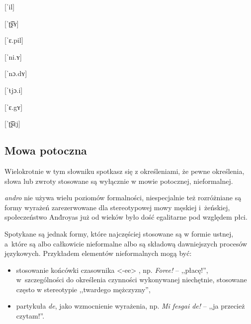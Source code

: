 \begin{spacing}{1.1}
\begin{multicols}{2}

        [ˈil]

        [ˈʈ͡ʂʏ]

        [ˈɛ.pil]

        [ˈni.ʏ]

        [ˈnɔ.dʏ]

        [ˈtjɔ.i]

        [ˈɛ.gʏ]

        [ˈʈ͡ʂɛj]

    \end{multicols}

    \subsection{Mowa potoczna}

    Wielokrotnie w tym słowniku spotkasz się z określeniami, że pewne określenia,
    słowa lub zwroty stosowane są wyłącznie w mowie potocznej, nieformalnej.

    \emph{andro} nie używa wielu poziomów formalności, niespecjalnie też rozróżniane
    są formy wyrażeń zarezerwowane dla stereotypowej mowy męskiej i~żeńskiej,
    społeczeństwo And́royas już od wieków było dość egalitarne pod względem płci.

    Spotykane są jednak formy, które najczęściej stosowane są w formie ustnej,
    a~które są albo całkowicie nieformalne albo są składową dawniejszych procesów
    językowych. Przykładem elementów nieformalnych mogą być:

    \begin{itemize}
        \item stosowanie końcówki czasownika <-ee> , np. \emph{Foree!}
               -- ,,płacę!'', w~szczególności do określenia czynności
              wykonywanej niechętnie, stosowane często w stereotypie ,,twardego
              mężczyzny'',
        \item partykuła \emph{de}, jako wzmocnienie wyrażenia, np. \emph{Mi fesgai
                  de!} -- ,,ja przecież czytam!''.
    \end{itemize}

\end{spacing}